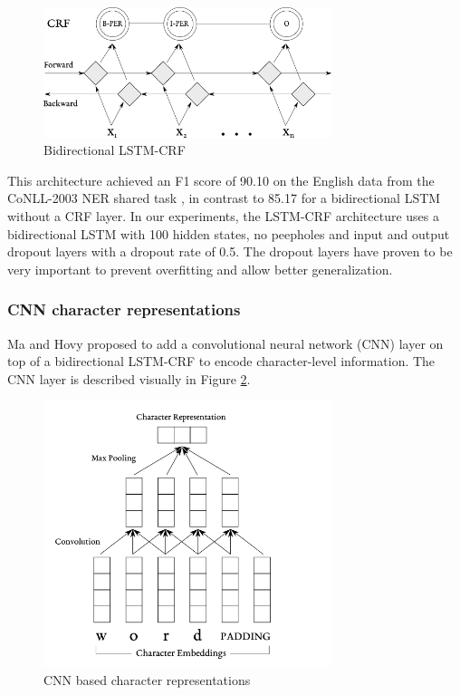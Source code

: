 \documentclass{nle}
\begin{document}
\begin{figure}[h]
  \centering
  \includegraphics[width=0.75\textwidth]{pics/bi_lstm_crf}
  \caption{Bidirectional LSTM-CRF}
  \label{fig:bi_lstm_crf}
\end{figure}

This architecture achieved an F1 score of 90.10 on the English data from the CoNLL-2003 
NER shared task \cite{Sang2003}, in contrast to 85.17 for a bidirectional LSTM without 
a CRF layer. 
In our experiments, the LSTM-CRF architecture uses a bidirectional LSTM with 100 
hidden states, no peepholes and input and output dropout layers with a dropout
rate of 0.5. The dropout layers have proven to be very important to prevent overfitting 
and allow better generalization.

\subsubsection{CNN character representations}
\label{sssec:lstm_crf_cnn}

Ma and Hovy  proposed to add a convolutional neural network (CNN) layer 
on top of a bidirectional LSTM-CRF to encode character-level information. The CNN
layer is described visually in Figure \ref{fig:cnn}.

\begin{figure}[h]
  \centering
	  \includegraphics[width=0.75\textwidth]{pics/cnn}
  \caption{CNN based character representations}
  \label{fig:cnn}
\end{figure}
\end{document}
